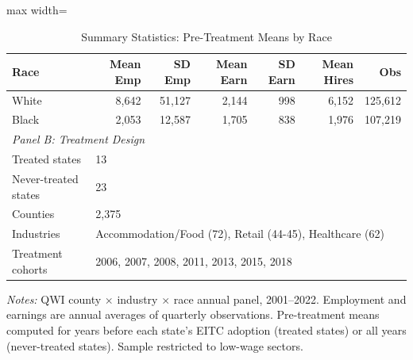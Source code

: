 \begin{table}[htbp]
\centering
\caption{Summary Statistics: Pre-Treatment Means by Race}
\label{tab:sumstats}
\begin{adjustbox}{max width=\textwidth}
\begin{tabular}{lrrrrrr}
\toprule
Race & Mean Emp & SD Emp & Mean Earn & SD Earn & Mean Hires & Obs \\
\midrule
White & 8,642 & 51,127 & 2,144 & 998 & 6,152 & 125,612 \\
Black & 2,053 & 12,587 & 1,705 & 838 & 1,976 & 107,219 \\
\midrule
\multicolumn{7}{l}{\textit{Panel B: Treatment Design}} \\
Treated states & \multicolumn{6}{l}{13} \\
Never-treated states & \multicolumn{6}{l}{23} \\
Counties & \multicolumn{6}{l}{2,375} \\
Industries & \multicolumn{6}{l}{Accommodation/Food (72), Retail (44-45), Healthcare (62)} \\
Treatment cohorts & \multicolumn{6}{l}{2006, 2007, 2008, 2011, 2013, 2015, 2018} \\
\bottomrule
\end{tabular}
\end{adjustbox}
\begin{tablenotes}
\item \textit{Notes:} QWI county $\times$ industry $\times$ race annual panel, 2001--2022. Employment and earnings are annual averages of quarterly observations. Pre-treatment means computed for years before each state's EITC adoption (treated states) or all years (never-treated states). Sample restricted to low-wage sectors.
\end{tablenotes}
\end{table}

